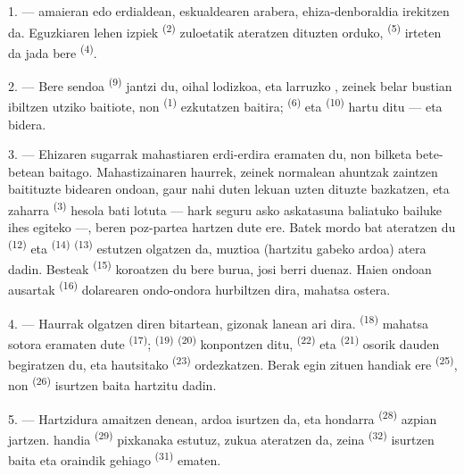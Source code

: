 1. ---  amaieran edo  erdialdean, eskualdearen
arabera, ehiza-denboraldia irekitzen da. Eguzkiaren lehen izpiek
 \textsuperscript{(2)} zuloetatik ateratzen dituzten orduko,
 \textsuperscript{(5)} irteten da jada bere 
\textsuperscript{(4)}.

2. --- Bere  sendoa \textsuperscript{(9)} jantzi du, oihal
lodizkoa, eta larruzko , zeinek belar bustian ibiltzen utziko
baitiote, non  \textsuperscript{(1)} ezkutatzen baitira;
 \textsuperscript{(6)} eta 
\textsuperscript{(10)} hartu ditu --- eta bidera.

3. --- Ehizaren sugarrak mahastiaren erdi-erdira eramaten du, non bilketa bete-betean
baitago. Mahastizainaren haurrek, zeinek normalean ahuntzak zaintzen baitituzte
bidearen ondoan, gaur nahi duten lekuan uzten dituzte bazkatzen, eta 
zaharra \textsuperscript{(3)} hesola bati lotuta --- hark seguru asko askatasuna
baliatuko bailuke ihes egiteko ---, beren poz-partea hartzen dute ere. Batek
mordo bat ateratzen du  \textsuperscript{(12)} eta
 \textsuperscript{(14)}  \textsuperscript{(13)}
estutzen olgatzen da, muztioa (hartzitu gabeko ardoa) atera dadin. Besteak
 \textsuperscript{(15)} koroatzen du bere burua, josi berri
duenaz. Haien ondoan  ausartak \textsuperscript{(16)} dolarearen
ondo-ondora hurbiltzen dira, mahatsa ostera.

4. --- Haurrak olgatzen diren bitartean, gizonak lanean ari dira.
 \textsuperscript{(18)} mahatsa sotora eramaten dute
 \textsuperscript{(17)}; 
\textsuperscript{(19)}  \textsuperscript{(20)} konpontzen ditu,
 \textsuperscript{(22)} eta 
\textsuperscript{(21)} osorik dauden begiratzen du, eta hautsitako
 \textsuperscript{(23)} ordezkatzen. Berak egin zituen
 handiak ere \textsuperscript{(25)}, non 
\textsuperscript{(26)} isurtzen baita hartzitu dadin.

5. --- Hartzidura amaitzen denean, ardoa isurtzen da, eta hondarra
 \textsuperscript{(28)} azpian jartzen. 
handia \textsuperscript{(29)} pixkanaka estutuz, zukua ateratzen da, zeina
 \textsuperscript{(32)} isurtzen baita eta oraindik 
gehiago \textsuperscript{(31)} ematen.

